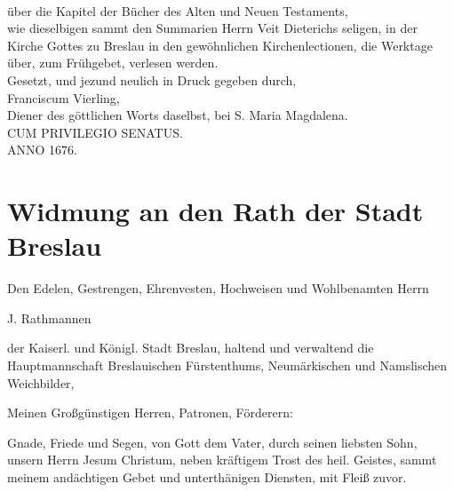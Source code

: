 \begin{titelseite}

\\[0.35em]

über die Kapitel der Bücher des Alten und Neuen Testaments,\\[0.35em]

wie dieselbigen sammt den Summarien Herrn Veit Dieterichs seligen, in der Kirche Gottes zu Breslau in den gewöhnlichen Kirchenlectionen, die Werktage über, zum Frühgebet, verlesen werden.\\[0.35em]

Gesetzt, und jezund neulich in Druck gegeben durch,\\[0.35em]

Franciscum Vierling,\\[0.35em]

Diener des göttlichen Worts daselbst, bei S. Maria Magdalena.\\[0.35em]

CUM PRIVILEGIO SENATUS.\\[0.35em]

ANNO 1676.

\end{titelseite}

\chapter{Widmung an den Rath der Stadt Breslau}

Den Edelen, Gestrengen, Ehrenvesten, Hochweisen und Wohlbenamten Herrn

J. Rathmannen

der Kaiserl. und Königl. Stadt Breslau, haltend und verwaltend die Hauptmannschaft Breslauischen Fürstenthums, Neumärkischen und Namslischen Weichbilder,

Meinen Großgünstigen Herren, Patronen, Förderern:

Gnade, Friede und Segen, von Gott dem Vater, durch seinen liebsten Sohn, unsern Herrn Jesum Christum, neben kräftigem Trost des heil. Geistes, sammt meinem andächtigen Gebet und unterthänigen Diensten, mit Fleiß zuvor.


